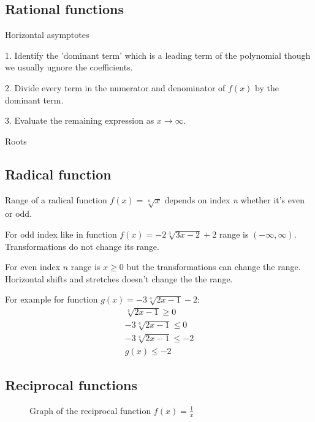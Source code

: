 \documentclass{article}
\begin{document}
\subsection{Rational functions}
Horizontal asymptotes

1. Identify the 'dominant term' which is a leading term of the polynomial though we
usually ugnore the coefficients.

2. Divide every term in the numerator and denominator of $f(x)$ by the dominant term.

3. Evaluate the remaining expression as $x \to \infty$.


Roots


\subsection{Radical function}
Range of a radical function $f(x) = \sqrt[n]{x}$ depends on index \textit{n} whether it's even or odd.

For odd index like in function $f(x) = -2\sqrt[3]{3x-2}+2$ range is $(-\infty, \infty)$.
Transformations do not change its range.

For even index $n$ range is $x \geqslant 0$ but the transformations can change the range.
Horizontal shifts and stretches doesn't change the the range.

For example for function $g(x) = -3\sqrt[4]{2x-1}-2$:
\begin{equation}
  \begin{gathered}
    \sqrt[4]{2x-1} \geqslant 0 \\
    -3\sqrt[4]{2x-1} \leqslant 0 \\
    -3\sqrt[4]{2x-1} \leqslant -2 \\
    g(x) \leqslant -2
  \end{gathered}
\end{equation}

\subsection{Reciprocal functions}

\begin{figure}
  \centering
  \caption{Graph of the reciprocal function $f(x) = \frac{1}{x}$}
\end{figure}
\end{document}

